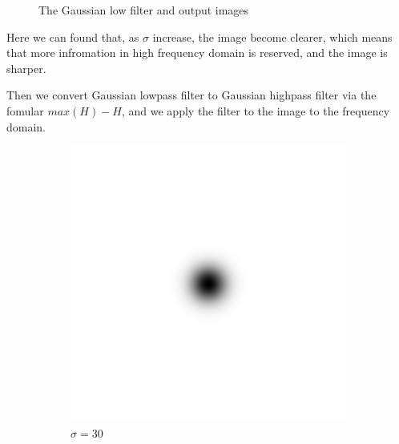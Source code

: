 \documentclass[
	12pt, %
]{style/fphw}
\begin{document}
\begin{figure}[H]
    \caption{The Gaussian low filter and output images}
    \label{Gaussian low filter}
\end{figure}

Here we can found that, as $\sigma$ increase, the image become clearer, which means that more infromation in high frequency domain is reserved, and the image is sharper.

Then we convert Gaussian lowpass filter to Gaussian highpass filter via the fomular $max(H)-H$, and we apply the filter to the image to the frequency domain.

\begin{figure}[H]
    \centering
     \begin{subfigure}[b]{.3\textwidth}
         \centering
         \includegraphics[width=\textwidth]{plots2/Q5_2_highpass_filter_30.png}
         \caption{$\sigma=30$}
         \label{Q5_2_highpass_filter_30}
     \end{subfigure}
     \hfill
     \begin{subfigure}[b]{.3\textwidth}
         \centering

\end{subfigure}
\end{figure}
\end{document}
